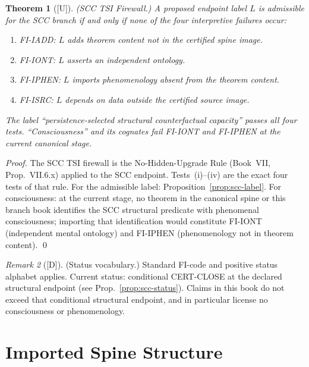 \documentclass[12pt,oneside]{amsbook}
\theoremstyle{plain}
\newtheorem{theorem}{Theorem}[section]
\theoremstyle{definition}
\theoremstyle{remark}
\newtheorem{remark}[theorem]{Remark}
\newcommand{\status}[1]{\textup{[#1]}}
\begin{document}
\begin{theorem}[\status{U}]\label{thm:scc-tsifirewall}
\textup{(SCC TSI Firewall.)} A proposed endpoint label $L$ is
admissible for the SCC branch if and only if none of the four
interpretive failures occur:
\begin{enumerate}[label=\textup{(\roman*)}]
 \item FI-IADD: $L$ adds theorem content not in the certified
 spine image.
 \item FI-IONT: $L$ asserts an independent ontology.
 \item FI-IPHEN: $L$ imports phenomenology absent from the
 theorem content.
 \item FI-ISRC: $L$ depends on data outside the certified
 source image.
\end{enumerate}
The label ``persistence-selected structural counterfactual
capacity'' passes all four tests. ``Consciousness'' and its
cognates fail FI-IONT and FI-IPHEN at the current canonical stage.
\end{theorem}

\begin{proof}
The SCC TSI firewall is the No-Hidden-Upgrade Rule
(Book~VII, Prop.~VII.6.x) applied to the SCC endpoint.
Tests~(i)--(iv) are the exact four tests of that rule.
For the admissible label: Proposition~\ref{prop:scc-label}.
For consciousness: at the current stage, no theorem in the
canonical spine or this branch book identifies the SCC structural
predicate with phenomenal consciousness; importing that
identification would constitute FI-IONT (independent mental
ontology) and FI-IPHEN (phenomenology not in theorem content).
\qed
\end{proof}

\begin{remark}[\status{D}]\label{rmk:scc-status-vocab}
\textup{(Status vocabulary.)} Standard FI-code and positive
status alphabet applies. Current status: conditional CERT-CLOSE at the
declared structural endpoint (see Prop.~\ref{prop:scc-status}). Claims
in this book do not exceed that conditional structural endpoint, and in
particular license no consciousness or phenomenology.
\end{remark}

\section{Imported Spine Structure}
\label{sec:imports}
\end{document}
